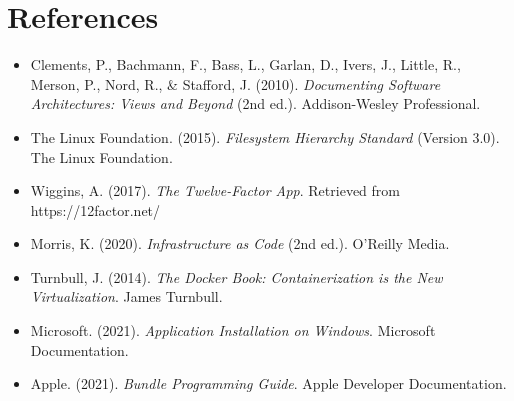 \documentclass[11pt]{article}
\begin{document}
\section*{References}

\begin{itemize}
  \item Clements, P., Bachmann, F., Bass, L., Garlan, D., Ivers, J., Little, R., Merson, P., Nord, R., \& Stafford, J. (2010). \textit{Documenting Software Architectures: Views and Beyond} (2nd ed.). Addison-Wesley Professional.
  \item The Linux Foundation. (2015). \textit{Filesystem Hierarchy Standard} (Version 3.0). The Linux Foundation.
  \item Wiggins, A. (2017). \textit{The Twelve-Factor App}. Retrieved from https://12factor.net/
  \item Morris, K. (2020). \textit{Infrastructure as Code} (2nd ed.). O'Reilly Media.
  \item Turnbull, J. (2014). \textit{The Docker Book: Containerization is the New Virtualization}. James Turnbull.
  \item Microsoft. (2021). \textit{Application Installation on Windows}. Microsoft Documentation.
  \item Apple. (2021). \textit{Bundle Programming Guide}. Apple Developer Documentation.
\end{itemize}

\listoffigures
\end{document}
